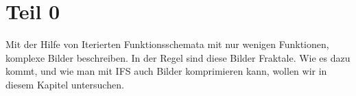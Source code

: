 %
%
%
\section{Teil 0\label{ifs:section:teil0}}
Mit der Hilfe von Iterierten Funktionsschemata mit nur wenigen Funktionen, komplexe Bilder beschreiben.
In der Regel sind diese Bilder Fraktale.
Wie es dazu kommt, und wie man mit IFS auch Bilder komprimieren kann, wollen wir in diesem Kapitel untersuchen.


